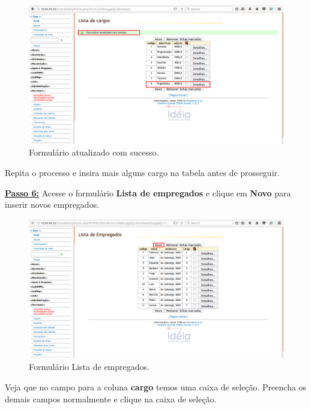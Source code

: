 \documentclass[9pt]{report}
\begin{document}
{       \begin{figure}[H]
        \includegraphics[width=\textwidth]{2_Formularios/3_Relacionamento_1_N/33.png}
        \caption{Formulário atualizado com sucesso.}
        \label{fig:cargoinserido}
       \end{figure}

       Repita o processo e insira mais alguns cargo na tabela antes
       de prosseguir.
      
       \underline{\textbf{Passo 6:}} Acesse o formulário
       \textbf{Lista de empregados} e clique em \textbf{Novo} para
       inserir novos empregados.

       \begin{figure}[H]
        \includegraphics[width=\textwidth]{2_Formularios/3_Relacionamento_1_N/34.png}
        \caption{Formulário Lista de empregados.}
        \label{fig:listaempregados}
       \end{figure}

       Veja que no campo para a coluna \textbf{cargo} temos uma caixa
       de seleção. Preencha os demais campos normalmente e clique na
       caixa de seleção.

}
\end{document}
